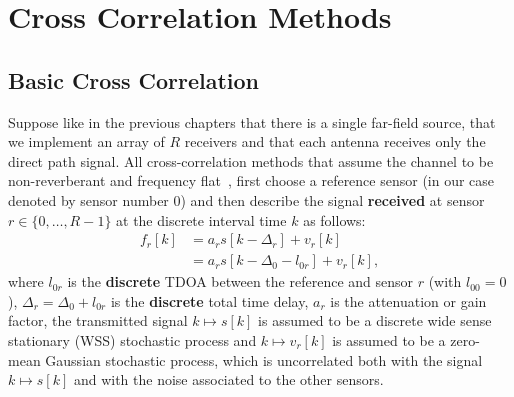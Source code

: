 \chapter{Cross Correlation Methods}
\label{ch:crosscorrere}

\section{Basic Cross Correlation}
Suppose like in the previous chapters that there is a single far-field source, that we implement an array of \(R\) receivers and that each antenna receives only the direct path signal. All cross-correlation methods that assume the channel to be non-reverberant and frequency flat~\cite{benesty2008microphone,Bimodal-sound-source-tracking,Falk2004}, first choose a reference sensor (in our case denoted by sensor number \(0\)) and then describe the signal \textbf{received} at sensor \(r\in\{0,\ldots,R-1\}\) at the discrete interval time \(k\) as follows:
\begin{equation}
\begin{aligned}
f_r[k]
& = a_{r} s\left[k-\Delta_r\right]+v_{r}[k]\\
& = a_{r} s\left[k-\Delta_0-l_{0r}\right]+v_{r}[k],
\end{aligned}
\label{eq:thecross}
\end{equation}
where \(l_{0r}\) is the \textbf{discrete} TDOA between the reference and sensor \(r\) (with \(l_{00}=0\)), \(\Delta_r=\Delta_0+l_{0r}\) is the \textbf{discrete} total time delay, \(a_{r}\) is the attenuation or gain factor, the transmitted signal \(k \mapsto s[k]\) is assumed to be a discrete wide sense stationary (WSS) stochastic process and \(k\mapsto v_{r}[k]\) is assumed to be a zero-mean Gaussian stochastic process, which is uncorrelated both with the signal \(k \mapsto s[k]\) and with the noise associated to the other sensors.

